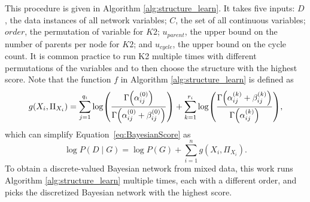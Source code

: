 This procedure is given in Algorithm \ref{alg:structure_learn}.
It takes five inputs: $D$, the data instances of all network variables; $C$, the set of all continuous variables; $order$, the permutation of variable for $K2$; $u_{parent}$, the upper bound on the number of parents per node for $K2$; and $u_{cycle}$, the upper bound on the cycle count.
It is common practice to run K2 multiple times with different permutations of the variables and to then choose the structure with the highest score. Note that the function $f$ in Algorithm \ref{alg:structure_learn} is defined as
\begin{equation}
\label{eq:B_Score_one}
g(X_i, \Pi_{X_i}) =  \sum_{j=1}^{q_i} \log\paren{
    \frac{
      \Gamma\paren{\alpha_{ij}^{(0)}}
    }{
      \Gamma\paren{\alpha_{ij}^{(0)} + \beta_{ij}^{(0)}}
    }
  } + \sum_{k=1}^{r_i} \log \paren{
    \frac{
      \Gamma\paren{\alpha_{ij}^{(k)} + \beta_{ij}^{(k)}}
    }{
      \Gamma\paren{\alpha_{ij}^{(k)}}
    }
  },
\end{equation}
which can simplify Equation~\ref{eq:BayesianScore} as
\begin{equation}
\log P(D\mid G) = \log P(G) + \sum_{i=1}^n g(X_i, \Pi_{X_i}) \text{.}
\end{equation}
To obtain a discrete-valued Bayesian network from mixed data, this work runs Algorithm \ref{alg:structure_learn} multiple times, each with a different order, and picks the discretized Bayesian network with the highest score.

